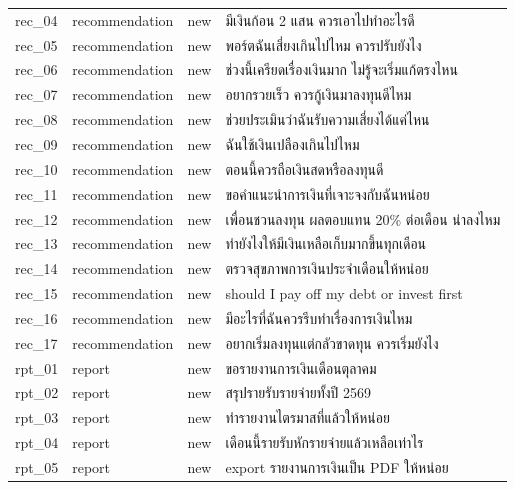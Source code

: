 \documentclass[11pt,a4paper]{article}
\begin{document}
{\begin{longtable}{lllp{9.5cm}}
rec\_\allowbreak{}04 & recommendation & new & {\thaifont มีเงินก้อน }2 {\thaifont แสน ควรเอาไปทำอะไรดี} \\
rec\_\allowbreak{}05 & recommendation & new & {\thaifont พอร์ตฉันเสี่ยงเกินไปไหม ควรปรับยังไง} \\
rec\_\allowbreak{}06 & recommendation & new & {\thaifont ช่วงนี้เครียดเรื่องเงินมาก ไม่รู้จะเริ่มแก้ตรงไหน} \\
rec\_\allowbreak{}07 & recommendation & new & {\thaifont อยากรวยเร็ว ควรกู้เงินมาลงทุนดีไหม} \\
rec\_\allowbreak{}08 & recommendation & new & {\thaifont ช่วยประเมินว่าฉันรับความเสี่ยงได้แค่ไหน} \\
rec\_\allowbreak{}09 & recommendation & new & {\thaifont ฉันใช้เงินเปลืองเกินไปไหม} \\
rec\_\allowbreak{}10 & recommendation & new & {\thaifont ตอนนี้ควรถือเงินสดหรือลงทุนดี} \\
rec\_\allowbreak{}11 & recommendation & new & {\thaifont ขอคำแนะนำการเงินที่เจาะจงกับฉันหน่อย} \\
rec\_\allowbreak{}12 & recommendation & new & {\thaifont เพื่อนชวนลงทุน ผลตอบแทน }20\% {\thaifont ต่อเดือน น่าลงไหม} \\
rec\_\allowbreak{}13 & recommendation & new & {\thaifont ทำยังไงให้มีเงินเหลือเก็บมากขึ้นทุกเดือน} \\
rec\_\allowbreak{}14 & recommendation & new & {\thaifont ตรวจสุขภาพการเงินประจำเดือนให้หน่อย} \\
rec\_\allowbreak{}15 & recommendation & new & should I pay off my debt or invest first \\
rec\_\allowbreak{}16 & recommendation & new & {\thaifont มีอะไรที่ฉันควรรีบทำเรื่องการเงินไหม} \\
rec\_\allowbreak{}17 & recommendation & new & {\thaifont อยากเริ่มลงทุนแต่กลัวขาดทุน ควรเริ่มยังไง} \\
rpt\_\allowbreak{}01 & report & new & {\thaifont ขอรายงานการเงินเดือนตุลาคม} \\
rpt\_\allowbreak{}02 & report & new & {\thaifont สรุปรายรับรายจ่ายทั้งปี }2569 \\
rpt\_\allowbreak{}03 & report & new & {\thaifont ทำรายงานไตรมาสที่แล้วให้หน่อย} \\
rpt\_\allowbreak{}04 & report & new & {\thaifont เดือนนี้รายรับหักรายจ่ายแล้วเหลือเท่าไร} \\
rpt\_\allowbreak{}05 & report & new & export {\thaifont รายงานการเงินเป็น }PDF {\thaifont ให้หน่อย} \\

\end{longtable}}
\end{document}
